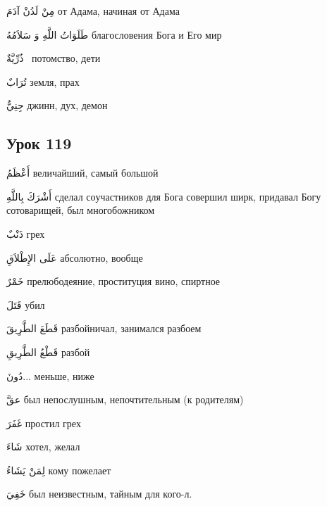\documentclass[a5paper]{article}
\newcommand\textstyleDropCaps[1]{#1}
\newcommand\textstyleCaptioncharacters[1]{#1}
\begin{document}
\textstyleCaptioncharacters{مِنْ لَدُنْ آدَمَ }\textstyleDropCaps{от Адама, начиная от Адама‎}

\textstyleCaptioncharacters{طَلَوَاتُ اللَّهِ وَ سَلاَمُهُ }\textstyleDropCaps{благословения Бога и Его мир ‎}

\textstyleCaptioncharacters{ذُرِّيَّةٌ \ }\textstyleDropCaps{потомство, дети‎}

\textstyleCaptioncharacters{تُرَابٌ }\textstyleDropCaps{земля, прах ‎}

\textstyleCaptioncharacters{جِنِيٌّ }\textstyleDropCaps{джинн, дух, демон‎}

\subsection[Урок 119‎]{\textstyleDropCaps{Урок 119‎}}
\textstyleCaptioncharacters{أَعْظَمُ }\textstyleDropCaps{величайший, са­мый большой‎}

\textstyleCaptioncharacters{أَشْرَكَ بِاللَّهِ }\textstyleDropCaps{сделал со­участников для Бога совершил ширк, придавал Богу сотоварищей, был многобожником‎}

\textstyleCaptioncharacters{ذَنْبٌ }\textstyleDropCaps{грех‎}

\textstyleCaptioncharacters{عَلَى الإِطْلاَقِ }\textstyleDropCaps{абсолют­но, вообще‎}

\textstyleCaptioncharacters{خَمْرٌ }\textstyleDropCaps{прелюбодеяние, про­ституция вино, спиртное‎}

\textstyleCaptioncharacters{قَتَلَ }\textstyleDropCaps{убил‎}

\textstyleCaptioncharacters{قَطَعَ الطَّرِيقَ }\textstyleDropCaps{разбойни­чал, занимался разбоем‎}

\textstyleCaptioncharacters{قَطْعُ الطَّرِيقِ }\textstyleDropCaps{разбой‎}

\textstyleCaptioncharacters{دُونَ... }\textstyleDropCaps{меньше, ниже‎}

\textstyleCaptioncharacters{عقَّ }\textstyleDropCaps{был непослушным, не­почтительным (к родителям)‎}

\textstyleCaptioncharacters{غَفَرَ }\textstyleDropCaps{простил грех ‎}

\textstyleCaptioncharacters{شَاءَ }\textstyleDropCaps{хотел, желал‎}

\textstyleCaptioncharacters{لِمَنْ يَشَاءُ }\textstyleDropCaps{кому пожела­ет‎}

\textstyleCaptioncharacters{خَفِيَ }\textstyleDropCaps{был неизвестным, тайным для кого-л.‎}
\end{document}
